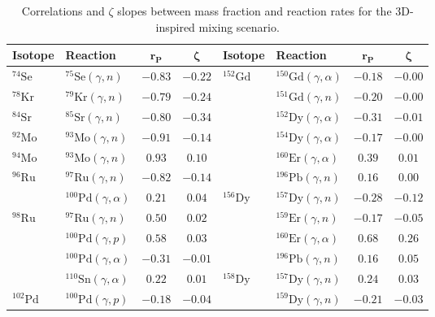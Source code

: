 \begin{table}
\caption{Correlations and $\zeta$ slopes between mass fraction and reaction rates for the 3D-inspired mixing scenario.
\label{tab:3d_corr}}
\scriptsize
    \begin{tabular}{llcc|llcc}
    \toprule
    \textbf{Isotope} & \textbf{Reaction} & $\mathbf{r_\mathrm{\mathbf{P}}}$ & $\mathbf{\zeta}$ & \textbf{Isotope} & \textbf{Reaction} & $\mathbf{r_\mathrm{\mathbf{P}}}$ & $\mathbf{\zeta}$ \\
    \toprule
    $^{74}\mathrm{Se}$ & $^{75}\mathrm{Se}(\gamma,n)$ & $-0.83$ & $-0.22$ & $^{152}\mathrm{Gd}$ & $^{150}\mathrm{Gd}(\gamma,\alpha)$ & $-0.18$ & $-0.00$ \\ 
    $^{78}\mathrm{Kr}$ & $^{79}\mathrm{Kr}(\gamma,n)$ & $-0.79$ & $-0.24$ & $ $ & $^{151}\mathrm{Gd}(\gamma,n)$ & $-0.20$ & $-0.00$ \\ 
    $^{84}\mathrm{Sr}$ & $^{85}\mathrm{Sr}(\gamma,n)$ & $-0.80$ & $-0.34$ & $ $ & $^{152}\mathrm{Dy}(\gamma,\alpha)$ & $-0.31$ & $-0.01$ \\ 
    $^{92}\mathrm{Mo}$ & $^{93}\mathrm{Mo}(\gamma,n)$ & $-0.91$ & $-0.14$ & $ $ & $^{154}\mathrm{Dy}(\gamma,\alpha)$ & $-0.17$ & $-0.00$ \\ 
    $^{94}\mathrm{Mo}$ & $^{93}\mathrm{Mo}(\gamma,n)$ & $0.93$ & $0.10$ & $ $ & $^{160}\mathrm{Er}(\gamma,\alpha)$ & $0.39$ & $0.01$ \\ 
    $^{96}\mathrm{Ru}$ & $^{97}\mathrm{Ru}(\gamma,n)$ & $-0.82$ & $-0.14$ & $ $ & $^{196}\mathrm{Pb}(\gamma,n)$ & $0.16$ & $0.00$ \\ 
    $ $ & $^{100}\mathrm{Pd}(\gamma,\alpha)$ & $0.21$ & $0.04$ & $^{156}\mathrm{Dy}$ & $^{157}\mathrm{Dy}(\gamma,n)$ & $-0.28$ & $-0.12$ \\ 
    $^{98}\mathrm{Ru}$ & $^{97}\mathrm{Ru}(\gamma,n)$ & $0.50$ & $0.02$ & $ $ & $^{159}\mathrm{Er}(\gamma,n)$ & $-0.17$ & $-0.05$ \\ 
    $ $ & $^{100}\mathrm{Pd}(\gamma,p)$ & $0.58$ & $0.03$ & $ $ & $^{160}\mathrm{Er}(\gamma,\alpha)$ & $0.68$ & $0.26$ \\ 
    $ $ & $^{100}\mathrm{Pd}(\gamma,\alpha)$ & $-0.31$ & $-0.01$ & $ $ & $^{196}\mathrm{Pb}(\gamma,n)$ & $0.16$ & $0.05$ \\ 
    $ $ & $^{110}\mathrm{Sn}(\gamma,\alpha)$ & $0.22$ & $0.01$ & $^{158}\mathrm{Dy}$ & $^{157}\mathrm{Dy}(\gamma,n)$ & $0.24$ & $0.03$ \\ 
    $^{102}\mathrm{Pd}$ & $^{100}\mathrm{Pd}(\gamma,p)$ & $-0.18$ & $-0.04$ & $ $ & $^{159}\mathrm{Dy}(\gamma,n)$ & $-0.21$ & $-0.03$ \\ 

\end{tabular}
\end{table}
